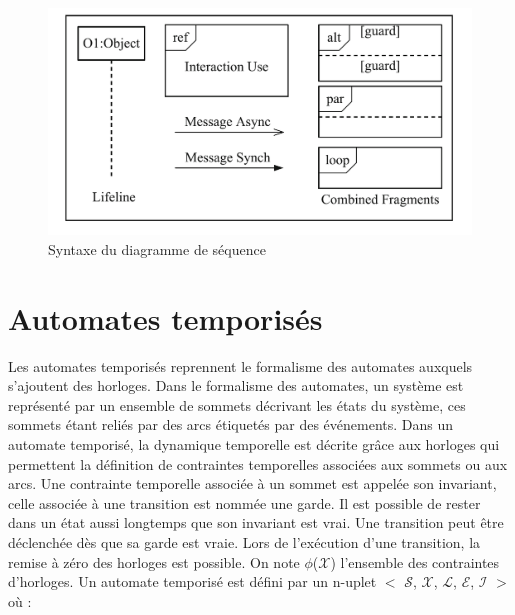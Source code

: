 \documentclass[french]{spimufcphdthesis}
\begin{document}
\begin{figure}[H]
\begin{center}
\includegraphics[scale=0.6]{figures/syntaxe_diagram.png}
\caption{Syntaxe du diagramme de séquence}
\label{syntaxe_seq}
\end{center}
\end{figure}


\section{Automates temporisés}

 Les automates temporisés reprennent
le formalisme des automates auxquels s’ajoutent des horloges. Dans le formalisme des automates, un système est représenté par un ensemble de sommets décrivant les états du système, ces sommets étant reliés par des arcs étiquetés par des événements.
Dans un automate temporisé, la dynamique temporelle est décrite grâce aux horloges qui permettent la définition de contraintes temporelles associées aux sommets ou aux
arcs. Une contrainte temporelle associée à un sommet est appelée son invariant, celle associée à une transition est nommée une garde. Il est possible de rester dans un état
aussi longtemps que son invariant est vrai. Une transition peut être déclenchée dès que sa garde est vraie. Lors de l’exécution d’une transition, la remise à zéro des horloges
est possible.
On note $\mathcal{\phi}$($\mathcal{X}$) l’ensemble des contraintes d’horloges. Un automate temporisé est défini par un n-uplet $\mathcal{<}$
$\mathcal{S}$, $\mathcal{X}$, $\mathcal{L}$, $\mathcal{E}$, $\mathcal{I}$ $\mathcal{>}$ où :
\end{document}
